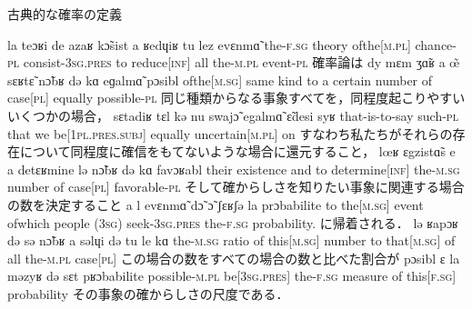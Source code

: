 \documentclass[main.tex]{subfiles}
\begin{document}
古典的な確率の定義\cite{laplace}
\begin{leftbar}
         {la teɔʁi de azaʁ {k\~{ɔ}sist\liaison} a ʁedɥiʁ tu {lez\liaison} evɛnm\~{ɑ}}
         {the-\textsc{f}.\textsc{sg} theory {of{\textunderscore}the[\textsc{m}.\textsc{pl}]} chance-\textsc{pl} consist-3\textsc{sg}.\textsc{pres} to {reduce[\textsc{inf}]} all the-\textsc{m}.\textsc{pl} event-\textsc{pl}}
         {確率論は}
         {dy mɛm {ʒ\~{ɑ}ʁ{\liaison}} a \~{œ} sɛʁt\~{ɛ} n\~{ɔ}bʁ də kɑ eɡalm\~{ɑ} pɔsibl}
         {{of{\textunderscore}the[\textsc{m}.\textsc{sg}]} same kind to a certain number of {case[\textsc{pl}]} equally possible-\textsc{pl}}
         {同じ種類からなる事象すべてを，同程度起こりやすいいくつかの場合，}
         {sɛtadiʁ tɛl kə nu swaj\~{ɔ} egalm\~{ɑ} \~{ɛ}desi syʁ}
         {that-is-to-say such-\textsc{pl} that we {be[1\textsc{pl}.\textsc{pres}.\textsc{subj}]} equally {uncertain[\textsc{m}.\textsc{pl}]} on}
         {すなわち私たちがそれらの存在について同程度に確信をもてないような場合に還元すること，}
         {{lœʁ\liaison} ɛgzist\~{ɑ}s e a detɛʁmine lə n\~{ɔ}bʁ də kɑ {favɔʁabl\liaison}}
         {their existence and to {determine[\textsc{inf}]} the-\textsc{m}.\textsc{sg} number of {case[\textsc{pl}]} favorable-\textsc{pl}}
         {そして確からしさを知りたい事象に関連する場合の数を決定すること}
         {a {l{\liaison}} evɛnm\~{ɑ} d\~{ɔ} \~{ɔ} ʃɛʁʃə la prɔbabilite}
         {to {the[\textsc{m}.\textsc{sg}]} event of{\textunderscore}which {people (3\textsc{sg})} seek-3\textsc{sg}.\textsc{pres} {the-\textsc{f}.\textsc{sg}} probability.}
         {に帰着される．}
         {lə ʁapɔʁ də sə {n\~{ɔ}bʁ{\liaison}} a səlɥi də tu le kɑ}
         {the-\textsc{m}.\textsc{sg} ratio of {this[\textsc{m}.\textsc{sg}]} number to {that[\textsc{m}.\textsc{sg}]} of all {the-\textsc{m}.\textsc{pl}} {case[\textsc{pl}]}}
         {この場合の数をすべての場合の数と比べた割合が}
         {{pɔsibl{\liaison}} ɛ la məzyʁ də sɛt pʁɔbabilite}
         {possible-\textsc{m}.\textsc{pl} {be[3\textsc{sg}.\textsc{pres}]} the-\textsc{f}.\textsc{sg} measure of {this[\textsc{f}.\textsc{sg}]} probability}
         {その事象の確からしさの尺度である．}

\end{leftbar}
\end{document}
